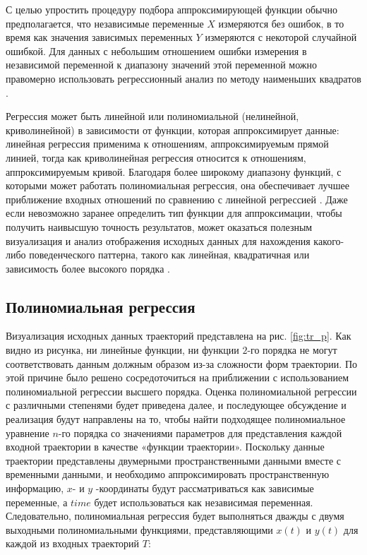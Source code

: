 С целью упростить процедуру подбора аппроксимирующей функции обычно предполагается, что независимые переменные $X$ измеряются без ошибок, в то время как значения зависимых переменных $Y$ измеряются с некоторой случайной ошибкой. Для данных с небольшим отношением ошибки измерения в независимой переменной к диапазону значений этой переменной можно правомерно использовать регрессионный анализ по методу наименьших квадратов \cite{article:behav_form_extr}.

Регрессия может быть линейной или полиномиальной (нелинейной, криволинейной) в зависимости от функции, которая аппроксимирует данные: линейная регрессия применима к отношениям, аппроксимируемым прямой линией, тогда как криволинейная регрессия относится к отношениям,  аппроксимируемым кривой. Благодаря более широкому диапазону функций, с которыми может работать полиномиальная регрессия, она обеспечивает лучшее приближение входных отношений по сравнению с линейной регрессией \cite{online:intro_lr_pr}. Даже если невозможно заранее определить тип функции для аппроксимации, чтобы получить наивысшую точность результатов, может оказаться полезным визуализация и анализ отображения исходных данных для нахождения какого-либо поведенческого паттерна, такого как линейная, квадратичная или зависимость более высокого порядка \cite{article:behav_form_extr}.

\subsection{Полиномиальная регрессия}

Визуализация исходных данных траекторий представлена на рис. \ref{fig:tr_p}. Как видно из рисунка, ни линейные функции, ни функции $2$-го порядка не могут соответствовать данным должным образом из-за сложности форм траектории. По этой причине было решено сосредоточиться на приближении с использованием полиномиальной регрессии высшего порядка. Оценка полиномиальной регрессии с различными степенями будет приведена далее, и последующее обсуждение и реализация будут направлены на то, чтобы найти подходящее полиномиальное уравнение $n$-го порядка со значениями параметров для представления каждой входной траектории в качестве «функции траектории». Поскольку данные траектории представлены двумерными пространственными данными вместе с временными данными, и необходимо аппроксимировать пространственную информацию, $x$- и $y$ -координаты будут рассматриваться как зависимые переменные, а $time$ будет использоваться как независимая переменная. Следовательно, полиномиальная регрессия будет выполняться дважды с двумя выходными полиномиальными функциями, представляющими $x(t)$ и $y(t)$ для каждой из входных траекторий $T$:

